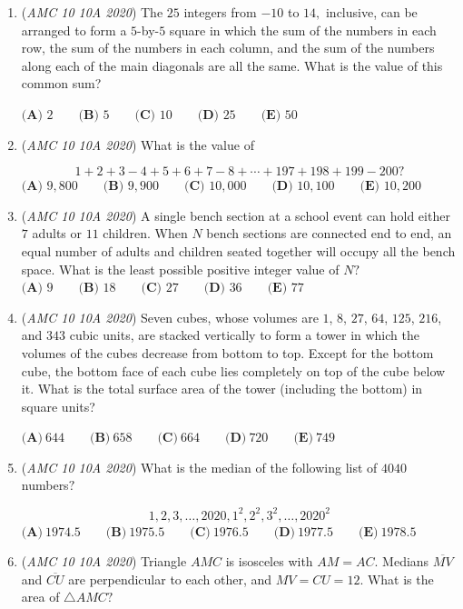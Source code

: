 \begin{enumerate}
	\item (\textit{AMC 10 10A 2020}) The $25$ integers from $-10$ to $14,$ inclusive, can be arranged to form a $5$-by-$5$ square in which the sum of the numbers in each row, the sum of the numbers in each column, and the sum of the numbers along each of the main diagonals are all the same. What is the value of this common sum?


 $\textbf{(A) }2 \qquad\textbf{(B) } 5\qquad\textbf{(C) } 10\qquad\textbf{(D) } 25\qquad\textbf{(E) } 50$


	\item (\textit{AMC 10 10A 2020}) What is the value of


 
 \[1+2+3-4+5+6+7-8+\cdots+197+198+199-200?\]
$\textbf{(A) } 9,800 \qquad \textbf{(B) } 9,900 \qquad \textbf{(C) } 10,000 \qquad \textbf{(D) } 10,100 \qquad \textbf{(E) } 10,200$


	\item (\textit{AMC 10 10A 2020}) A single bench section at a school event can hold either $7$ adults or $11$ children. When $N$ bench sections are connected end to end, an equal number of adults and children seated together will occupy all the bench space. What is the least possible positive integer value of $N?$
$\textbf{(A) } 9 \qquad \textbf{(B) } 18 \qquad \textbf{(C) } 27 \qquad \textbf{(D) } 36 \qquad \textbf{(E) } 77$


	\item (\textit{AMC 10 10A 2020}) Seven cubes, whose volumes are $1$, $8$, $27$, $64$, $125$, $216$, and $343$ cubic units, are stacked vertically to form a tower in which the volumes of the cubes decrease from bottom to top. Except for the bottom cube, the bottom face of each cube lies completely on top of the cube below it. What is the total surface area of the tower (including the bottom) in square units?


 $\textbf{(A)}\ 644\qquad\textbf{(B)}\ 658\qquad\textbf{(C)}\ 664\qquad\textbf{(D)}\ 720\qquad\textbf{(E)}\ 749$


	\item (\textit{AMC 10 10A 2020}) What is the median of the following list of $4040$ numbers$?$

 \[1, 2, 3, \ldots, 2020, 1^2, 2^2, 3^2, \ldots, 2020^2\]
$\textbf{(A)}\ 1974.5\qquad\textbf{(B)}\ 1975.5\qquad\textbf{(C)}\ 1976.5\qquad\textbf{(D)}\ 1977.5\qquad\textbf{(E)}\ 1978.5$


	\item (\textit{AMC 10 10A 2020}) Triangle $AMC$ is isosceles with $AM = AC$. Medians $\overline{MV}$ and $\overline{CU}$ are perpendicular to each other, and $MV=CU=12$. What is the area of $\triangle AMC?$


\end{enumerate}
